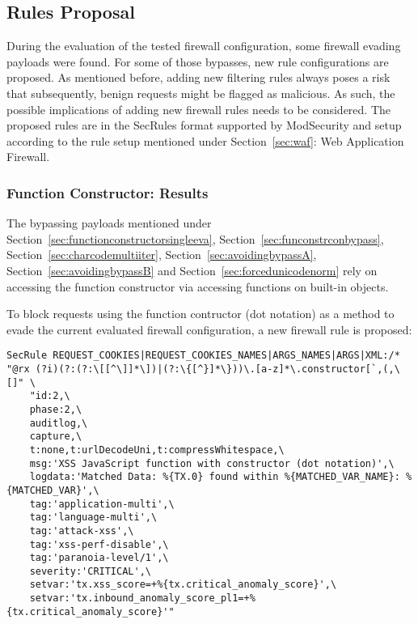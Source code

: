 \subsection{Rules Proposal}
\label{sec:rulesproposal}
During the evaluation of the tested firewall configuration, some firewall evading payloads were found. For some of those bypasses, new rule configurations are proposed. As mentioned before, adding new filtering rules always poses a risk that subsequently, benign requests might be flagged as malicious. As such, the possible implications of adding new firewall rules needs to be considered.
The proposed rules are in the SecRules format supported by ModSecurity and setup according to the rule setup mentioned under Section~\ref{sec:waf}: Web Application Firewall.

\subsubsection{Function Constructor: Results}
\label{sec:rulespropfunctionconstructor}
The bypassing payloads mentioned under Section~\ref{sec:functionconstructorsingleeva}, Section~\ref{sec:funconstrconbypass}, Section~\ref{sec:charcodemultiiter}, Section~\ref{sec:avoidingbypassA}, Section~\ref{sec:avoidingbypassB} and Section~\ref{sec:forcedunicodenorm} rely on accessing the function constructor via accessing functions on built-in objects.

To block requests using the function contructor (dot notation) as a method to evade the current evaluated firewall configuration, a new firewall rule is proposed:

\begin{lstlisting}[style=basicStyle, caption=Rule proposal to block usage of Function() constructor in dot notation, label={lst:constructorsruleproposal}]
SecRule REQUEST_COOKIES|REQUEST_COOKIES_NAMES|ARGS_NAMES|ARGS|XML:/* "@rx (?i)(?:(?:\[[^\]]*\])|(?:\{[^}]*\}))\.[a-z]*\.constructor[`,(,\[]" \
    "id:2,\
    phase:2,\
    auditlog,\
    capture,\
    t:none,t:urlDecodeUni,t:compressWhitespace,\
    msg:'XSS JavaScript function with constructor (dot notation)',\
    logdata:'Matched Data: %{TX.0} found within %{MATCHED_VAR_NAME}: %{MATCHED_VAR}',\
    tag:'application-multi',\
    tag:'language-multi',\
    tag:'attack-xss',\
    tag:'xss-perf-disable',\
    tag:'paranoia-level/1',\
    severity:'CRITICAL',\
    setvar:'tx.xss_score=+%{tx.critical_anomaly_score}',\
    setvar:'tx.inbound_anomaly_score_pl1=+%{tx.critical_anomaly_score}'"
\end{lstlisting}


